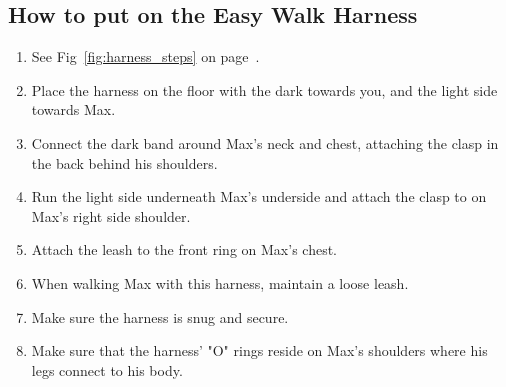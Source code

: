 \documentclass[pdftex,12pt]{article}
\begin{document}
\subsection{How to put on the Easy Walk Harness}
\begin{enumerate}\label{itm:how_to_harness}
    \item See Fig~\ref{fig:harness_steps} on page~\pageref{fig:harness_steps}.
    \item Place the harness on the floor with the dark towards you, and
        the light side towards Max.
    \item Connect the dark band around Max's neck and chest, attaching the clasp
        in the back behind his shoulders.
    \item Run the light side underneath Max's underside and attach the clasp to
        on Max's right side shoulder.
    \item Attach the leash to the front ring on Max's chest.
    \item When walking Max with this harness, maintain a loose leash.
    \item Make sure the harness is snug and secure.
    \item Make sure that the harness' "O" rings reside on Max's shoulders where
        his legs connect to his body.
\end{enumerate}
\end{document}
